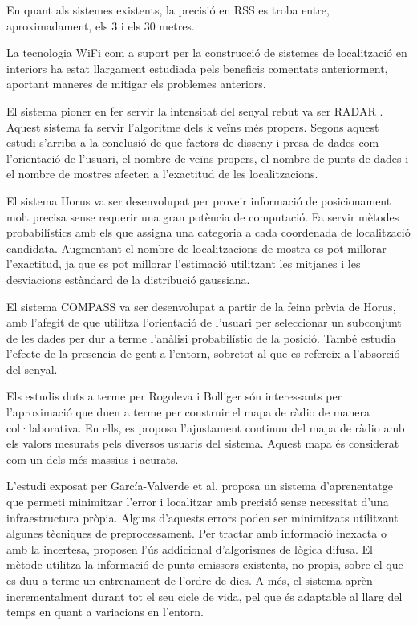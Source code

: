 En quant als sistemes existents, la precisió en RSS es troba entre, aproximadament, els 3 i els 30 metres.

La tecnologia WiFi com a suport per la construcció de sistemes de localització en interiors ha estat llargament estudiada pels beneficis comentats anteriorment, aportant maneres de mitigar els problemes anteriors.

El sistema pioner en fer servir la intensitat del senyal rebut va ser RADAR \cite{bahl}. Aquest sistema fa servir l'algoritme dels k veïns més propers. Segons aquest estudi s'arriba a la conclusió de que factors de disseny i presa de dades com l'orientació de l'usuari, el nombre de veïns propers, el nombre de punts de dades i el nombre de mostres afecten a l'exactitud de les localitzacions.

El sistema Horus \cite{youssef} va ser desenvolupat per proveir informació de posicionament molt precisa sense requerir una gran potència de computació. Fa servir mètodes probabilístics amb els que assigna una categoria a cada coordenada de localització candidata. Augmentant el nombre de localitzacions de mostra es pot millorar l'exactitud, ja que es pot millorar l'estimació utilitzant les mitjanes i les desviacions estàndard de la distribució gaussiana.

El sistema COMPASS \cite{king} va ser desenvolupat a partir de la feina prèvia de Horus, amb l’afegit de que utilitza l'orientació de l’usuari per seleccionar un subconjunt de les dades per dur a terme l’anàlisi probabilístic de la posició. També estudia l’efecte de la presencia de gent a l’entorn, sobretot al que es refereix a l’absorció del senyal.

Els estudis duts a terme per Rogoleva \cite{rogoleva} i Bolliger \cite{bolliger} són interessants per l’aproximació que duen a terme per construir el mapa de ràdio de manera col·laborativa. En ells, es proposa l’ajustament continuu del mapa de ràdio amb els valors mesurats pels diversos usuaris del sistema. Aquest mapa és considerat com un dels més massius i acurats.

L'estudi exposat per García-Valverde et al. \cite{garcia} proposa un sistema d'aprenentatge que permeti minimitzar l'error i localitzar amb precisió sense necessitat d'una infraestructura pròpia. Alguns d'aquests errors poden ser minimitzats utilitzant algunes tècniques de preprocessament.  Per tractar amb informació inexacta o amb la incertesa, proposen l'ús addicional d'algorismes de lògica difusa. El mètode utilitza la informació de punts emissors existents, no propis, sobre el que es duu a terme un entrenament de l'ordre de dies. A més, el sistema aprèn incrementalment durant tot el seu cicle de vida, pel que és adaptable al llarg del temps en quant a variacions en l’entorn.


